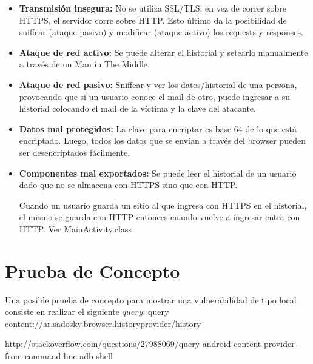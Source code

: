 \documentclass[10pt, a4paper]{article}
\begin{document}
\begin{itemize}
\item \textbf{Transmisión insegura:} No se utiliza SSL/TLS: en vez de correr sobre HTTPS, el servidor corre sobre HTTP. Esto último da la posibilidad de sniffear (ataque pasivo) y modificar (ataque activo) los requests y responses.

\item \textbf{Ataque de red activo:} Se puede alterar el historial y setearlo manualmente a través de un Man in The Middle.

\item \textbf{Ataque de red pasivo:} Sniffear y ver los datos/historial de una persona, provocando que si un usuario conoce el mail de otro, puede ingresar a su historial colocando el mail de la víctima y la clave del atacante.

\item \textbf{Datos mal protegidos:} La clave para encriptar es base 64 de lo que está encriptado. Luego, todos los datos que se envían a través del browser pueden ser desencriptados fácilmente. 

\item \textbf{Componentes mal exportados:} Se puede leer el historial de un usuario dado que no se almacena con HTTPS sino que con HTTP.

Cuando un usuario guarda un sitio al que ingresa con HTTPS en el historial, el mismo se guarda con HTTP entonces cuando vuelve a ingresar entra con HTTP. Ver MainActivity.class

\end{itemize}

\section{Prueba de Concepto}

Una posible prueba de concepto para mostrar una vulnerabilidad de tipo local consiste en realizar el siguiente $query$:
query content://ar.sadosky.browser.historyprovider/history

http://stackoverflow.com/questions/27988069/query-android-content-provider-from-command-line-adb-shell
\end{document}
